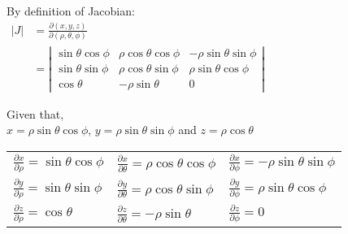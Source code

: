 \documentclass[11pt]{extarticle}
\begin{document}
\vspace{2ex}
\begin{minipage}[t]{0.46\linewidth}
\noindent
      By definition of Jacobian:\\[1ex]
      $\begin{aligned}
         |J| &=  \frac{\partial(x, y, z)}{\partial(\rho, \theta, \phi)}\\
         &= \left|\begin{array}{ccc}
            \sin\theta \cos\phi &
            \rho \cos\theta \cos\phi &
            -\rho \sin\theta \sin\phi \\[2ex]
            \sin\theta \sin\phi & 
            \rho \cos\theta \sin\phi & 
            \rho \sin\theta \cos\phi \\[2ex]
            \cos\theta & -\rho \sin\theta & 0
         \end{array}\right|
   \end{aligned}$
\end{minipage}\hspace{0.5ex}
\begin{minipage}[t]{0.52\linewidth}
\noindent
   Given that,\\
   $x=\rho \sin\theta \cos\phi$, \tab $y=\rho \sin\theta \sin\phi$ \tab and \tab $z=\rho \cos\theta$

   \vspace{3ex}
   \begin{tabular}{lll}
      $\frac{\partial x}{\partial \rho} = \sin\theta \cos\phi$
      &
      $\frac{\partial x}{\partial \theta} =
      \rho \cos\theta \cos\phi$
      &
      $\frac{\partial x}{\partial \phi} =
      -\rho \sin\theta \sin\phi$
      \\[2.5ex]

      $\frac{\partial y}{\partial \rho} = \sin\theta \sin\phi$
      &
      $\frac{\partial y}{\partial \theta} = 
      \rho \cos\theta \sin\phi$
      &
      $\frac{\partial y}{\partial \phi} = 
      \rho \sin\theta \cos\phi$
      \\[2.5ex]

      $\frac{\partial z}{\partial \rho} = \cos\theta$
      &
      $\frac{\partial z}{\partial \theta} = -\rho \sin\theta$
      &
      $\frac{\partial z}{\partial \phi} = 0$
   \end{tabular}
\end{minipage}
\end{document}

